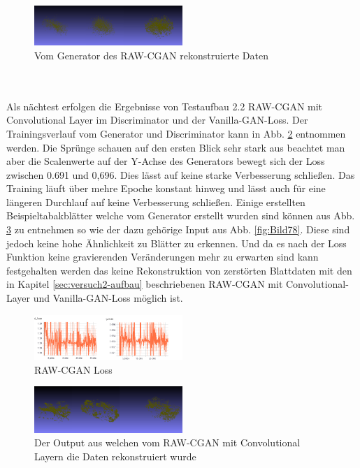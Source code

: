 \documentclass{llncs}
\begin{document}
\begin{figure}[htbp] 
	\centering
	\includegraphics[width=0.5\textwidth]{fake_wgan_fully_rawcgan.png}
	\caption{Vom Generator des RAW-CGAN rekonstruierte Daten}
	\label{fig:Bild77}
\end{figure}
~\\\\
Als nächtest  erfolgen die Ergebnisse von Testaufbau 2.2 RAW-CGAN mit Convolutional Layer im Discriminator und der Vanilla-GAN-Loss. Der Trainingsverlauf vom Generator und Discriminator kann in Abb. \ref{fig:Bild79} entnommen werden. Die Sprünge schauen auf den ersten Blick sehr stark aus beachtet man aber die Scalenwerte auf der Y-Achse des Generators bewegt sich der Loss zwischen 0.691 und 0,696. Dies lässt auf keine starke Verbesserung schließen. Das Training läuft über mehre Epoche konstant hinweg und lässt auch für eine längeren Durchlauf auf keine Verbesserung schließen. Einige erstellten Beispieltabakblätter welche vom Generator erstellt wurden sind können aus Abb. \ref{fig:Bild80} zu entnehmen so wie der dazu gehörige Input aus Abb. \ref{fig:Bild78}. Diese sind jedoch keine hohe Ähnlichkeit zu Blätter zu erkennen. Und da es nach der Loss Funktion keine gravierenden Veränderungen mehr zu erwarten sind kann festgehalten werden das keine Rekonstruktion von zerstörten Blattdaten mit den in Kapitel \ref{sec:versuch2-aufbau} beschriebenen RAW-CGAN mit Convolutional-Layer und Vanilla-GAN-Loss möglich ist. 

\begin{figure}[htbp] 
	\centering
	\includegraphics[width=0.5\textwidth]{cgan_loss_vanilla.png}
	\caption{RAW-CGAN Loss}
	\label{fig:Bild79}
\end{figure}

\begin{figure}[htbp] 
	\centering
	\includegraphics[width=0.5\textwidth]{dcpgan_ws_fake.png}
	\caption{Der Output aus welchen vom RAW-CGAN mit Convolutional Layern die Daten rekonstruiert wurde}
	\label{fig:Bild80}
\end{figure}
\end{document}
